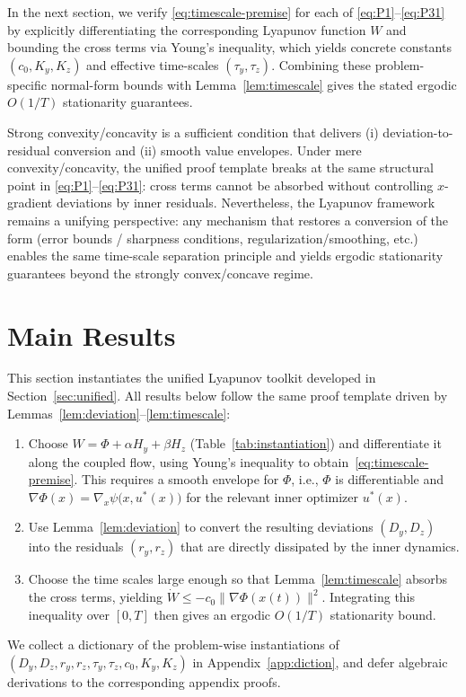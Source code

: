 \documentclass{article}
\newcommand{\1}{\mathbf{1}}
\begin{document}
In the next section, we verify \eqref{eq:timescale-premise} for each of \ref{eq:P1}--\ref{eq:P31} by explicitly differentiating the corresponding Lyapunov function $W$
and bounding the cross terms via Young's inequality, which yields concrete constants $(c_0,K_y,K_z)$ and effective time-scales $(\tau_y,\tau_z)$.
Combining these problem-specific normal-form bounds with Lemma~\ref{lem:timescale} gives the stated ergodic $O(1/T)$ stationarity guarantees.


Strong convexity/concavity is a sufficient condition that delivers (i) deviation-to-residual conversion and (ii) smooth value envelopes.
Under mere convexity/concavity, the unified proof template breaks at the same structural point in \ref{eq:P1}--\ref{eq:P31}:
cross terms cannot be absorbed without controlling $x$-gradient deviations by inner residuals.
Nevertheless, the Lyapunov framework remains a unifying perspective: any mechanism that restores a conversion of the form (error bounds / sharpness conditions, regularization/smoothing, etc.) enables the same
time-scale separation principle and yields ergodic stationarity guarantees beyond the strongly convex/concave regime. 


\section{Main Results}\label{sec:main-results}
This section instantiates the unified Lyapunov toolkit developed in Section~\ref{sec:unified}.
All results below follow the same proof template driven by Lemmas~\ref{lem:deviation}--\ref{lem:timescale}:
\begin{enumerate}[label=\textbf{S\arabic*.}, ref=\textbf{S\arabic*}]
\item\label{step:S1}
Choose $W=\Phi+\alpha H_y+\beta H_z$ (Table~\ref{tab:instantiation}) and differentiate it along the coupled flow,
using Young's inequality to obtain~\eqref{eq:timescale-premise}.
This requires a smooth envelope for $\Phi$, i.e., $\Phi$ is differentiable and
$\nabla \Phi(x)=\nabla_x \psi\bigl(x,u^*(x)\bigr)$ for the relevant inner optimizer $u^*(x)$.

\item\label{step:S2}
Use Lemma~\ref{lem:deviation}
to convert the resulting deviations $(D_y,D_z)$ into the residuals $(r_y,r_z)$
that are directly dissipated by the inner dynamics.

\item\label{step:S3}
Choose the time scales large enough so that Lemma~\ref{lem:timescale} absorbs the cross terms, yielding
$\dot W \le -c_0\|\nabla \Phi(x(t))\|^2$.
Integrating this inequality over $[0,T]$ then gives an ergodic $O(1/T)$ stationarity bound.
\end{enumerate}
We collect a dictionary of the
problem-wise instantiations of $(D_y,D_z,r_y,r_z,\tau_y,\tau_z,c_0,K_y,K_z)$ in Appendix~\ref{app:diction},
and defer algebraic derivations to the corresponding appendix proofs.
\end{document}
